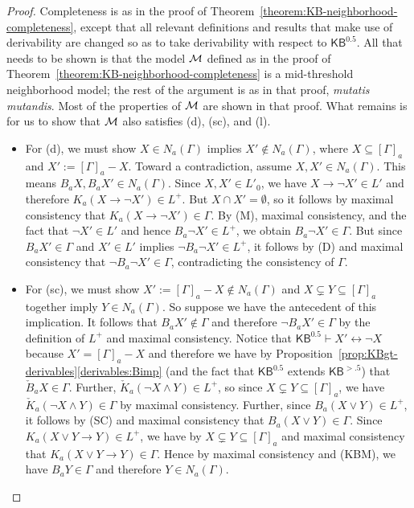 \documentclass[12pt]{article}
\theoremstyle{definition}
\newcommand{\M}{{\cal M}}      %
\newcommand{\KBeq}{{\mathsf{KB}^{\mathsf{0.5}}}}       %
\newcommand{\KBgt}{{\mathsf{KB}^{\mathsf{>.5}}}}       %
\begin{document}
\begin{proof}
  Completeness is as in the proof of Theorem~\ref{theorem:KB-neighborhood-completeness},
  except that all relevant definitions and results that make use of derivability are changed
  so as to take derivability with respect to $\KBeq$.  All that needs
  to be shown is that the model $\M$ defined as in the proof of
  Theorem~\ref{theorem:KB-neighborhood-completeness} is a mid-threshold
  neighborhood model; the rest of the argument is as in that proof,
  \emph{mutatis mutandis}.  Most of the properties of $\M$ are shown
  in that proof.  What remains is for us to show that $\M$ also satisfies
  (d), (sc), and (l).
  \begin{itemize}
  \item For (d), we must show $X\in N_a(\Gamma)$ implies
    $X'\notin N_a(\Gamma)$, where 
    $X\subseteq[\Gamma]_a$ and
    $X':=[\Gamma]_a-X$.  Toward a contradiction, assume
    $X,X'\in N_a(\Gamma)$.
    This means $B_aX,B_aX'\in N_a(\Gamma)$.  Since $X,X'\in L'_0$,
    we have $X\to\lnot X'\in L'$ and therefore
    $K_a(X\to\lnot X')\in L^+$.  But
    $X\cap X'=\emptyset$, so it follows by maximal consistency that
    $K_a(X\to\lnot X')\in\Gamma$.  By (M), maximal consistency,
    and the fact that $\lnot X'\in L'$ and hence $B_a\lnot X'\in L^+$, we obtain
    $B_a\lnot X'\in\Gamma$.  But since $B_a X'\in\Gamma$ and
    $X'\in L'$ implies $\lnot B_a\lnot X'\in L^+$, it follows by (D) and
    maximal consistency that $\lnot B_a\lnot X'\in\Gamma$, contradicting
    the consistency of $\Gamma$.

  \item For (sc), we must show $X':=[\Gamma]_a-X\notin N_a(\Gamma)$ and
    $X\subsetneq Y\subseteq[\Gamma]_a$ together imply $Y\in
    N_a(\Gamma)$.  So suppose we have the antecedent of this implication.
    It follows that $B_aX'\notin\Gamma$ and therefore $\lnot B_aX'\in\Gamma$
    by the definition of $L^+$ and maximal consistency.  Notice that
    $\KBeq\vdash X'\leftrightarrow\lnot X$ because $X'=[\Gamma]_a-X$
    and therefore we have by Proposition~\ref{prop:KBgt-derivables}\eqref{derivables:Bimp}
    (and the fact that $\KBeq$ extends $\KBgt$) that $\check B_aX\in\Gamma$.
    Further, $\check K_a(\lnot X\land Y)\in L^+$, so since $X\subsetneq Y\subseteq[\Gamma]_a$,
    we have $\check K_a(\lnot X\land Y)\in\Gamma$ by maximal consistency.  Further,
    since $B_a(X\lor Y)\in L^+$, it follows by (SC) and maximal consistency that
    $B_a(X\lor Y)\in\Gamma$.  Since $K_a(X\lor Y\to Y)\in L^+$, we have
    by $X\subsetneq Y\subseteq[\Gamma]_a$ and maximal consistency that
    $K_a(X\lor Y\to Y)\in\Gamma$.  Hence by maximal consistency and (KBM),
    we have $B_aY\in\Gamma$ and therefore $Y\in N_a(\Gamma)$.


\end{itemize}
\end{proof}
\end{document}
